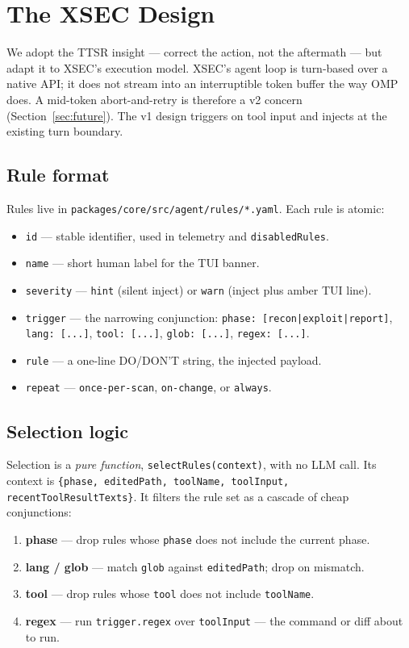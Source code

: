 \documentclass[11pt]{article}
\begin{document}
\section{The XSEC Design}
\label{sec:design}

We adopt the TTSR insight --- correct the action, not the aftermath --- but
adapt it to XSEC's execution model. XSEC's agent loop is turn-based over a native
API; it does not stream into an interruptible token buffer the way OMP does.
A mid-token abort-and-retry is therefore a v2 concern (Section~\ref{sec:future}).
The v1 design triggers on tool input and injects at the existing turn boundary.

\subsection{Rule format}

Rules live in \texttt{packages/core/src/agent/rules/*.yaml}. Each rule is atomic:

\begin{itemize}[leftmargin=*,itemsep=1pt]
  \item \texttt{id} --- stable identifier, used in telemetry and \texttt{disabledRules}.
  \item \texttt{name} --- short human label for the TUI banner.
  \item \texttt{severity} --- \texttt{hint} (silent inject) or \texttt{warn} (inject plus amber TUI line).
  \item \texttt{trigger} --- the narrowing conjunction: \texttt{phase: [recon|exploit|report]}, \texttt{lang: [...]}, \texttt{tool: [...]}, \texttt{glob: [...]}, \texttt{regex: [...]}.
  \item \texttt{rule} --- a one-line DO/DON'T string, the injected payload.
  \item \texttt{repeat} --- \texttt{once-per-scan}, \texttt{on-change}, or \texttt{always}.
\end{itemize}

\subsection{Selection logic}

Selection is a \emph{pure function}, \texttt{selectRules(context)}, with no LLM
call. Its context is
\texttt{\{phase, editedPath, toolName, toolInput, recentToolResultTexts\}}. It
filters the rule set as a cascade of cheap conjunctions:

\begin{enumerate}[leftmargin=*,itemsep=1pt]
  \item \textbf{phase} --- drop rules whose \texttt{phase} does not include the current phase.
  \item \textbf{lang / glob} --- match \texttt{glob} against \texttt{editedPath}; drop on mismatch.
  \item \textbf{tool} --- drop rules whose \texttt{tool} does not include \texttt{toolName}.
  \item \textbf{regex} --- run \texttt{trigger.regex} over \texttt{toolInput} --- the command or diff about to run.
\end{enumerate}
\end{document}
